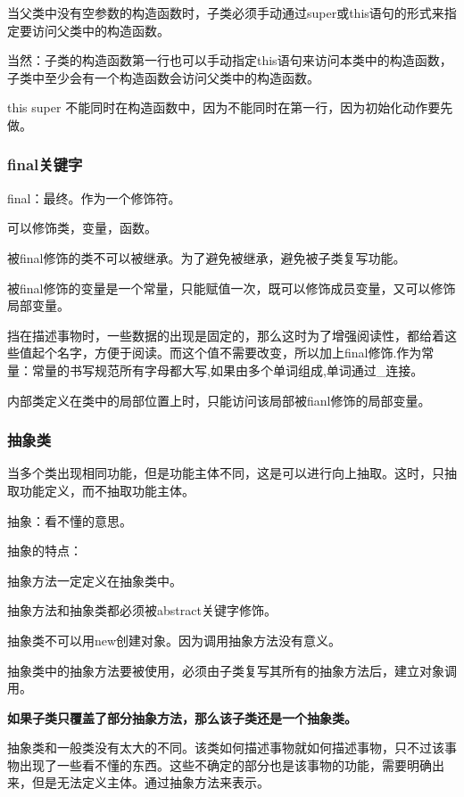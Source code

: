 \documentclass[UTF8]{ctexart}
\begin{document}
\textbullet 当父类中没有空参数的构造函数时，子类必须手动通过super或this语句的形式来指定要访问父类中的构造函数。

当然：子类的构造函数第一行也可以手动指定this语句来访问本类中的构造函数，子类中至少会有一个构造函数会访问父类中的构造函数。

this super 不能同时在构造函数中，因为不能同时在第一行，因为初始化动作要先做。


\subsubsection{final关键字}
final：最终。作为一个修饰符。

\textbullet 可以修饰类，变量，函数。

\textbullet 被final修饰的类不可以被继承。为了避免被继承，避免被子类复写功能。

\textbullet 被final修饰的变量是一个常量，只能赋值一次，既可以修饰成员变量，又可以修饰局部变量。

挡在描述事物时，一些数据的出现是固定的，那么这时为了增强阅读性，都给着这些值起个名字，方便于阅读。而这个值不需要改变，所以加上final修饰.作为常量：常量的书写规范所有字母都大写,如果由多个单词组成,单词通过\_连接。

\textbullet 内部类定义在类中的局部位置上时，只能访问该局部被fianl修饰的局部变量。

\subsubsection{抽象类}

当多个类出现相同功能，但是功能主体不同，这是可以进行向上抽取。这时，只抽取功能定义，而不抽取功能主体。

抽象：看不懂的意思。

抽象的特点：

\textbullet 抽象方法一定定义在抽象类中。

\textbullet 抽象方法和抽象类都必须被abstract关键字修饰。

\textbullet 抽象类不可以用new创建对象。因为调用抽象方法没有意义。

\textbullet 抽象类中的抽象方法要被使用，必须由子类复写其所有的抽象方法后，建立对象调用。

\textbf{如果子类只覆盖了部分抽象方法，那么该子类还是一个抽象类。}

抽象类和一般类没有太大的不同。该类如何描述事物就如何描述事物，只不过该事物出现了一些看不懂的东西。这些不确定的部分也是该事物的功能，需要明确出来，但是无法定义主体。通过抽象方法来表示。
\end{document}
